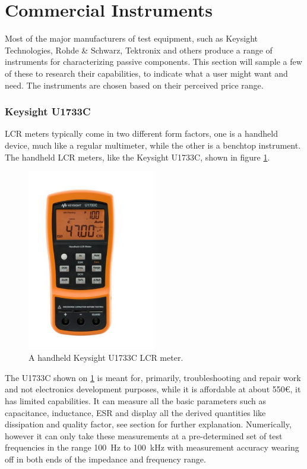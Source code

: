 \section{Commercial Instruments} \label{sec:CommercialImpedanceMeasurement}
Most of the major manufacturers of test equipment, such as Keysight Technologies, Rohde \& Schwarz, Tektronix and others produce a range of instruments for characterizing passive components. This section will sample a few of these to research their capabilities, to indicate what a user might want and need. The instruments are chosen based on their perceived price range. 


\subsubsection*{Keysight U1733C}
LCR meters typically come in two different form factors, one is a handheld device, much like a regular multimeter, while the other is a benchtop instrument. The handheld LCR meters, like the Keysight U1733C\cite{KeysightU1733C}, shown in figure \ref{fig:2_2_U1733C}.
\begin{figure}[H]
    \centering
    \includegraphics[clip, trim=0 50 0 50, width=0.5\textwidth]{Sections/2_ProblemAnalysis/FIgures/KeysightU1733C.pdf}
    \caption{A handheld Keysight U1733C LCR meter.\cite{KeysightU1733C}}
    \label{fig:2_2_U1733C}
\end{figure}
The U1733C shown on \ref{fig:2_2_U1733C} is meant for, primarily, troubleshooting and repair work and not electronics development purposes, while it is affordable at about 550€, it has limited capabilities. It can measure all the basic parameters such as capacitance, inductance, ESR and display all the derived quantities like dissipation and quality factor, see section  for further explanation. Numerically, however it can only take these measurements at a pre-determined set of test frequencies in the range \SI[]{100}{\hertz} to \SI[]{100}{\kilo\hertz} with measurement accuracy wearing off in both ends of the impedance and frequency range.

